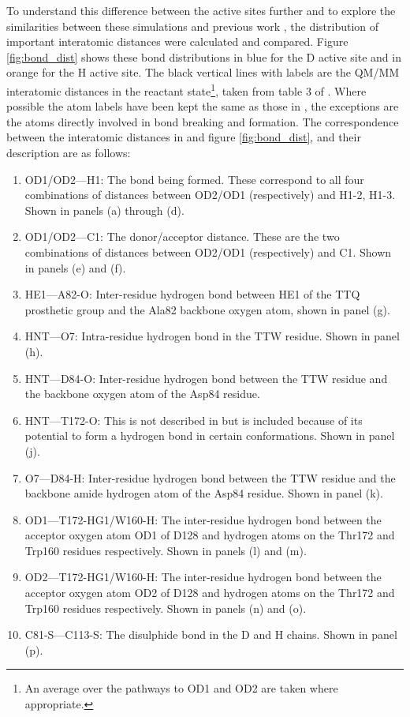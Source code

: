 To understand this difference between the active sites further and to explore the similarities between these simulations and previous work \cite{ranaghanInitioQMMM2017}, the distribution of important interatomic distances were calculated and compared. Figure \ref{fig:bond_dist} shows these bond distributions in blue for the D active site and in orange for the H active site. The black vertical lines with labels are the QM/MM interatomic distances in the reactant state\footnote{An average over the pathways to OD1 and OD2 are taken where appropriate.}, taken from table 3 of \cite{ranaghanInitioQMMM2017}. Where possible  the atom labels have been kept the same as those in \cite{ranaghanInitioQMMM2017}, the exceptions are the atoms directly involved in bond breaking and formation. The correspondence between the interatomic distances in \cite{ranaghanInitioQMMM2017} and figure \ref{fig:bond_dist}, and their description are as follows: 
\begin{enumerate}
    \item OD1/OD2---H1:  The bond being formed. These correspond to all four combinations of distances between OD2/OD1 (respectively) and H1-2, H1-3. Shown in panels (a) through (d). 
    \item OD1/OD2---C1: The donor/acceptor distance. These are the two combinations of distances between OD2/OD1 (respectively) and C1. Shown in panels (e) and (f). 
    \item HE1---A82-O: Inter-residue hydrogen bond between HE1 of the TTQ prosthetic group and the Ala82 backbone oxygen atom, shown in panel (g). 
    \item HNT---O7: Intra-residue hydrogen bond in the TTW residue. Shown in panel (h). 
    \item HNT---D84-O: Inter-residue hydrogen bond between the TTW residue and the backbone oxygen atom of the Asp84 residue. 
    \item HNT---T172-O: This is not described in \cite{ranaghanInitioQMMM2017} but is included because of its potential to form a hydrogen bond in certain conformations. Shown in panel (j). 
    \item O7---D84-H: Inter-residue hydrogen bond between the TTW residue and the backbone amide hydrogen atom of the Asp84 residue. Shown in panel (k). 
    \item OD1---T172-HG1/W160-H: The inter-residue hydrogen bond between the acceptor oxygen atom OD1 of D128 and hydrogen atoms on the Thr172 and Trp160 residues respectively. Shown in panels (l) and (m).
    \item OD2---T172-HG1/W160-H: The inter-residue hydrogen bond between the acceptor oxygen atom OD2 of D128 and hydrogen atoms on the Thr172 and Trp160 residues respectively. Shown in panels (n) and (o).\label{o1_t172}
    \item C81-S---C113-S: The disulphide bond in the D and H chains. Shown in panel (p). \label{cs_cs} 
\end{enumerate}

